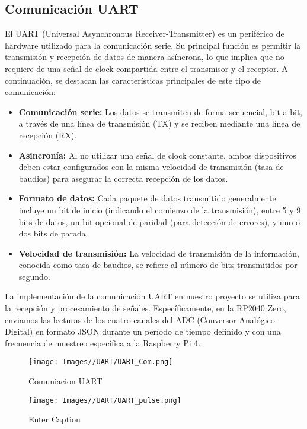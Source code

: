\documentclass{article}
\begin{document}
\subsection{Comunicación UART}

El UART (Universal Asynchronous Receiver-Transmitter) es un periférico de hardware utilizado para la comunicación serie. Su principal función es permitir la transmisión y recepción de datos de manera asíncrona, lo que implica que no requiere de una señal de clock compartida entre el transmisor y el receptor. A continuación, se destacan las características principales de este tipo de comunicación:

\begin{itemize}
    \item \textbf{Comunicación serie:} Los datos se transmiten de forma secuencial, bit a bit, a través de una línea de transmisión (TX) y se reciben mediante una línea de recepción (RX).
    \item \textbf{Asincronía:} Al no utilizar una señal de clock constante, ambos dispositivos deben estar configurados con la misma velocidad de transmisión (tasa de baudios) para asegurar la correcta recepción de los datos.
    \item \textbf{Formato de datos:} Cada paquete de datos transmitido generalmente incluye un bit de inicio (indicando el comienzo de la transmisión), entre 5 y 9 bits de datos, un bit opcional de paridad (para detección de errores), y uno o dos bits de parada.
    \item \textbf{Velocidad de transmisión:} La velocidad de transmisión de la información, conocida como tasa de baudios, se refiere al número de bits transmitidos por segundo.
\end{itemize}

La implementación de la comunicación UART en nuestro proyecto se utiliza para la recepción y procesamiento de señales. Específicamente, en la RP2040 Zero, enviamos las lecturas de los cuatro canales del ADC (Conversor Analógico-Digital) en formato JSON durante un período de tiempo definido y con una frecuencia de muestreo específica a la Raspberry Pi 4.

\begin{figure}[H]
    \centering
    \texttt{[image: Images//UART/UART\_Com.png]}
    \caption{Comuniacion UART}
    \label{fig:enter-label}
\end{figure}

\begin{figure}[H]
    \centering
    \texttt{[image: Images//UART/UART\_pulse.png]}
    \caption{Enter Caption}
    \label{fig:enter-label}
\end{figure}
\end{document}
